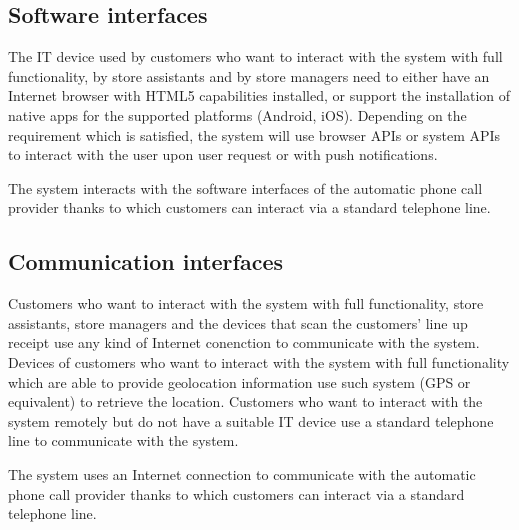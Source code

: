 \documentclass[../../main.tex]{subfiles}
\begin{document}
\subsection{Software interfaces}

The IT device used by customers who want to interact with the system with full functionality, by store assistants and by store managers need to either have an Internet browser with HTML5 capabilities installed, or support the installation of native apps for the supported platforms (Android, iOS). Depending on the requirement which is satisfied, the system will use browser APIs or system APIs to interact with the user upon user request or with push notifications.

The system interacts with the software interfaces of the automatic phone call provider thanks to which customers can interact via a standard telephone line.

\subsection{Communication interfaces}

Customers who want to interact with the system with full functionality, store assistants, store managers and the devices that scan the customers' line up receipt use any kind of Internet conenction to communicate with the system. Devices of customers who want to interact with the system with full functionality which are able to provide geolocation information use such system (GPS or equivalent) to retrieve the location. Customers who want to interact with the system remotely but do not have a suitable IT device use a standard telephone line to communicate with the system.

The system uses an Internet connection to communicate with the automatic phone call provider thanks to which customers can interact via a standard telephone line.
\end{document}
